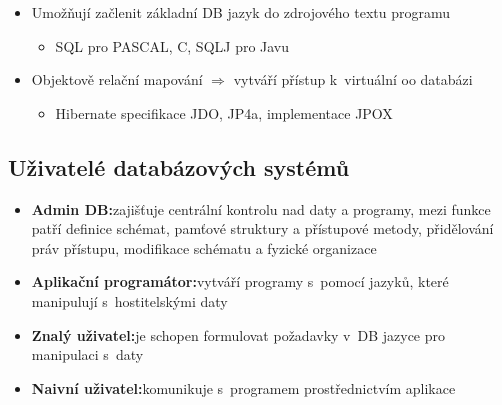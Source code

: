 \documentclass[a4paper,10pt]{article}
\newcommand{\pojem}[2]{\item \textbf{#1:}\quad #2}
\newcommand{\tedy}{$\Rightarrow$ }
\begin{document}
\begin{itemize}
          \item Umožňují začlenit základní DB jazyk do zdrojového textu programu
          \begin{itemize}
            \item SQL pro PASCAL, C, SQLJ pro Javu
          \end{itemize}

          \item Objektově relační mapování \tedy vytváří přístup k~virtuální oo databázi
          \begin{itemize}
            \item Hibernate specifikace JDO, JP4a, implementace JPOX
          \end{itemize}
        \end{itemize}

      \subsection{Uživatelé databázových systémů}
        \begin{itemize}
          \pojem{Admin DB}{zajišťuje centrální kontrolu nad daty a programy, mezi funkce patří definice schémat, pamťové struktury a přístupové metody, přidělování práv přístupu, modifikace schématu a fyzické organizace}
          \pojem{Aplikační programátor}{vytváří programy s~pomocí jazyků, které manipulují s~hostitelskými daty}
          \pojem{Znalý uživatel}{je schopen formulovat požadavky v~DB jazyce pro manipulaci s~daty}
          \pojem{Naivní uživatel}{komunikuje s~programem prostřednictvím aplikace}
        \end{itemize}
\end{document}
